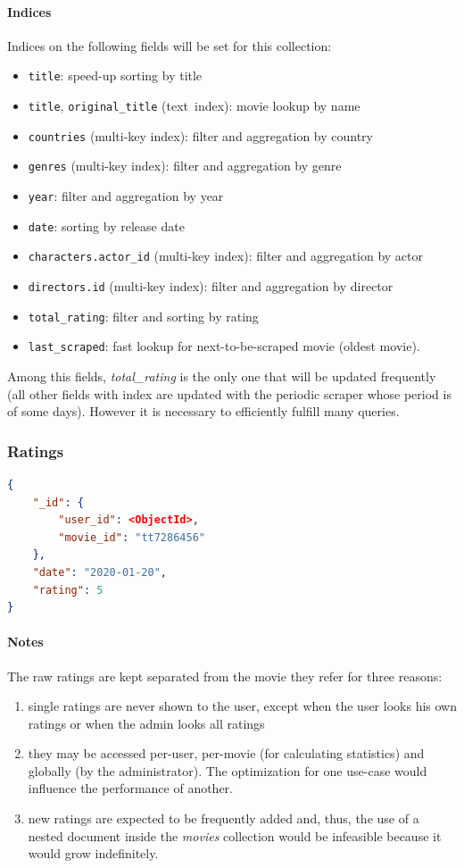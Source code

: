 \documentclass[11pt]{article}
\begin{document}
\paragraph{Indices} 
Indices on the following fields will be set for this collection:
\begin{itemize}
	\item \texttt{title}: speed-up sorting by title
	\item \texttt{title}, \texttt{original\_title} (text\ index): movie lookup 
			by name
	\item \texttt{countries} (multi-key index): filter and aggregation by country
	\item \texttt{genres} (multi-key index): filter and aggregation by genre
	\item \texttt{year}: filter and aggregation by year
	\item \texttt{date}: sorting by release date
	\item \texttt{characters.actor\_id} (multi-key index): filter and aggregation by actor
	\item \texttt{directors.id} (multi-key index): filter and aggregation by director
	\item \texttt{total\_rating}: filter and sorting by rating
	\item \texttt{last\_scraped}: fast lookup for next-to-be-scraped movie (oldest movie).
\end{itemize}

Among this fields, \emph{total\_rating} is the only one that will be updated 
frequently (all other fields with index are updated with the periodic scraper 
whose period is of some days). However it is necessary to efficiently fulfill 
many queries.

\subsubsection{Ratings}
\label{sec:ratings}

\begin{lstlisting}[language=json]	
{
	"_id": {
		"user_id": <ObjectId>,
		"movie_id": "tt7286456"
	},
	"date": "2020-01-20",
	"rating": 5
}
\end{lstlisting}

\paragraph{Notes}
The raw ratings are kept separated from the movie they refer for three reasons:
\begin{enumerate}
	\item single ratings are never shown to the user, except when the user 
			looks his own ratings or when the admin looks all ratings	
	\item they may be accessed per-user, per-movie (for calculating 	
			statistics) and globally (by the administrator). The optimization for one use-case would influence the performance of another.
	\item new ratings are expected to be frequently added and, thus, the use of 
		a nested document inside the \emph{movies} collection would be 
		infeasible because it would grow indefinitely. 
\end{enumerate} 
\end{document}
